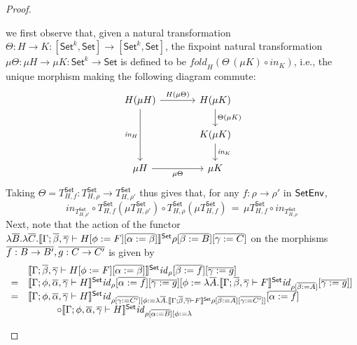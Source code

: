 \documentclass[acmsmall,review,anonymous]{acmart}
\theoremstyle{definition}
\newcommand{\set}{\mathsf{Set}}
\renewcommand{\id}{\mathit{id}}
\begin{document}
\begin{proof}
\begin{itemize}
we first observe that, given a natural transformation $\Theta : H \to
K : [\set^k, \set] \to [\set^k, \set]$, the fixpoint natural
transformation $\mu \Theta : \mu H \to \mu K : \set^k \to \set$ is
defined to be $\textit{fold}_{H}(\Theta\,(\mu K) \circ
\textit{in}_{K})$, i.e., the unique morphism making the following
diagram commute:\label{page:dia1}
{\footnotesize
\[\begin{tikzcd}[column sep = large]
H(\mu H)
	\ar[dd, "{\textit{in}_H}"']
	\ar[r, "{H(\mu \Theta)}"]
& H(\mu K)
	\ar[d, "{\Theta (\mu K)}"] \\
& K(\mu K)
	\ar[d, "{\textit{in}_K}"] \\
\mu H
	\ar[r, "{\mu \Theta}"']
& \mu K
\end{tikzcd}\]}
Taking $\Theta = T^{\set}_{H,f}: T^{\set}_{H,\rho} \to
T^{\set}_{H,\rho'}$ thus gives that, for any $f : \rho \to \rho'$ in
$\mathsf{SetEnv}$,
\begin{equation}\label{eq:mu-sigma-def}
\mathit{in}_{T^{\set}_{H,\rho'}} \circ 
T^{\set}_{H,f} (\mu T^{\set}_{H,\rho'}) \circ 
T^{\set}_{H,\rho}(\mu T^{\set}_{H,f}) \,=\, 
\mu T^{\set}_{H,f} \circ \mathit{in}_{T^{\set}_{H,\rho}}
\end{equation}
Next, note that the action of the functor
$\lambda \ol{B}. \lambda \ol{C}. \setsem{\Gamma; \ol{\beta},
  \ol{\gamma} \vdash H[\phi := F][\ol{\alpha := \beta}]}\rho
        [\ol{\beta := B}] [\ol{\gamma := C}]$
on the morphisms $\overline{f : B \to B'}, \overline{g : C \to C'}$ is given by
\[\begin{array}{ll}
 & \setsem{\Gamma; \ol{\beta}, \ol{\gamma} \vdash H[\phi :=
      F][\ol{\alpha := \beta}]} \id_{\rho} [\ol{\beta := f}]
           [\ol{\gamma := g}]\\
= & \setsem{\Gamma; \phi, \ol{\alpha}, \ol{\gamma} \vdash H}
\id_{\rho}[\ol{\alpha := f}] [\ol{\gamma := g}][\phi := \lambda
  \ol{A}. \setsem{\Gamma; \ol{\beta}, \ol{\gamma} \vdash F} \id_{\rho
    [\ol{\beta := A}]} [\ol{\gamma := g}]] \\ 
=& \setsem{\Gamma; \phi, \ol{\alpha}, \ol{\gamma} \vdash H} \id_{\rho
  [\ol{\gamma := C'}][\phi := \lambda \ol{A}. \setsem{\Gamma;
      \ol{\beta}, \ol{\gamma} \vdash F} \rho [\ol{\beta := A}]
    [\ol{\gamma := C'}]]} [\ol{\alpha := f}] \\
&\hspace{3em} \circ \setsem{\Gamma; \phi, \ol{\alpha}, \ol{\gamma}
  \vdash H} \id_{\rho [\ol{\alpha := B}][\phi := \lambda
}
\end{array}\]
\end{itemize}
\end{proof}
\end{document}
